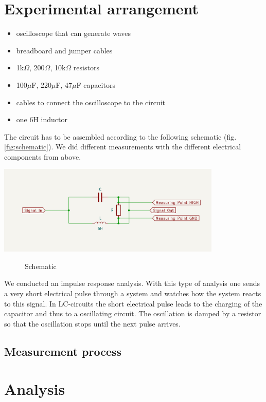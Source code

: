 \documentclass[a4paper,11pt]{article}
\begin{document}
\section{Experimental arrangement}

\begin{itemize}
The following materials are necessary to conduct the experiment:
    \item oscilloscope that can generate waves
    \item breadboard and jumper cables
    \item 1k$\Omega$, 200$\Omega$, 10k$\Omega$ resistors
    \item 100$\mu$F, 220$\mu$F, 47$\mu$F capacitors
    \item cables to connect the oscilloscope to the circuit
    \item one 6H inductor
\end{itemize}

The circuit has to be assembled according to the following schematic (fig. \ref{fig:schematic}). We did different measurements with the different electrical components from above. 

    \includegraphics[width=0.8\textwidth]{images/Screenshot 2023-04-05 at 21.19.41.png}
    \centering
\begin{figure}[!ht]
    \caption{Schematic}
\end{figure}

    \label{fig:schematic}
We conducted an impulse response analysis. With this type of analysis one sends a very short electrical pulse through a system and watches how the system reacts to this signal. In LC-circuits the short electrical pulse leads to the charging of the capacitor and thus to a oscillating circuit. The oscillation is damped by a resistor so that the oscillation stops until the next pulse arrives.
\subsection{Measurement process}

\section{Analysis}
\end{document}
